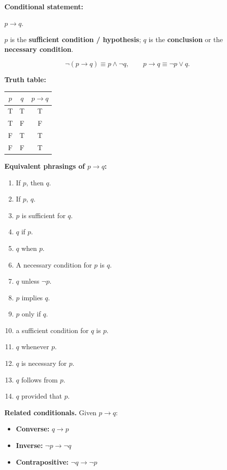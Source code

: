 \documentclass{article}
\begin{document}
\bigskip

\textbf{Conditional statement:} 

\smallskip
$p \to q$.

\smallskip

$p$ is the \textbf{sufficient condition / hypothesis}; $q$ is the \textbf{conclusion} or the \textbf{necessary condition}.

\medskip

\[
\lnot (p \to q) \equiv p \land \lnot q, \qquad p \to q \equiv \lnot p \lor q.
\]

\medskip

\textbf{Truth table:}
\begin{center}
\begin{tabular}{cc|c}
$p$ & $q$ & $p \to q$ \\
\hline
T & T & T \\
T & F & F \\
F & T & T \\
F & F & T
\end{tabular}
\end{center}

\medskip

\textbf{Equivalent phrasings of $p \to q$:}
\begin{enumerate}
\item If $p$, then $q$.
\item If $p$, $q$.
\item $p$ is sufficient for $q$.
\item $q$ if $p$.
\item $q$ when $p$.
\item A necessary condition for $p$ is $q$.
\item $q$ unless $\lnot p$.
\item $p$ implies $q$.
\item $p$ only if $q$.
\item a sufficient condition for $q$ is $p$.
\item $q$ whenever $p$.
\item $q$ is necessary for $p$.
\item $q$ follows from $p$.
\item $q$ provided that $p$.
\end{enumerate}

\bigskip

\textbf{Related conditionals.} Given $p \to q$:
\begin{itemize}
\item \textbf{Converse:} $q \to p$
\item \textbf{Inverse:} $\lnot p \to \lnot q$
\item \textbf{Contrapositive:} $\lnot q \to \lnot p$
\end{itemize}
\end{document}
